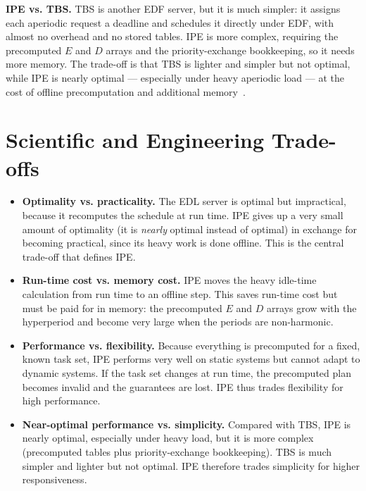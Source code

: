 \documentclass[conference]{IEEEtran}
\begin{document}
\noindent\textbf{IPE vs. TBS.}
TBS is another EDF server, but it is much simpler: it assigns each aperiodic
request a deadline and schedules it directly under EDF, with almost no overhead
and no stored tables. IPE is more complex, requiring the precomputed $E$ and
$D$ arrays and the priority-exchange bookkeeping, so it needs more memory. The
trade-off is that TBS is lighter and simpler but not optimal, while IPE is
nearly optimal --- especially under heavy aperiodic load --- at the cost of
offline precomputation and additional memory~\cite{buttazzo}.

\section{Scientific and Engineering Trade-offs}

\begin{itemize}
  \item \textbf{Optimality vs. practicality.} The EDL server is optimal but
        impractical, because it recomputes the schedule at run time. IPE gives
        up a very small amount of optimality (it is \emph{nearly} optimal
        instead of optimal) in exchange for becoming practical, since its heavy
        work is done offline. This is the central trade-off that defines IPE.
  \item \textbf{Run-time cost vs. memory cost.} IPE moves the heavy idle-time
        calculation from run time to an offline step. This saves run-time cost
        but must be paid for in memory: the precomputed $E$ and $D$ arrays grow
        with the hyperperiod and become very large when the periods are
        non-harmonic.
  \item \textbf{Performance vs. flexibility.} Because everything is precomputed
        for a fixed, known task set, IPE performs very well on static systems
        but cannot adapt to dynamic systems. If the task set changes at run
        time, the precomputed plan becomes invalid and the guarantees are lost.
        IPE thus trades flexibility for high performance.
  \item \textbf{Near-optimal performance vs. simplicity.} Compared with TBS,
        IPE is nearly optimal, especially under heavy load, but it is more
        complex (precomputed tables plus priority-exchange bookkeeping). TBS is
        much simpler and lighter but not optimal. IPE therefore trades
        simplicity for higher responsiveness.
\end{itemize}
\end{document}

